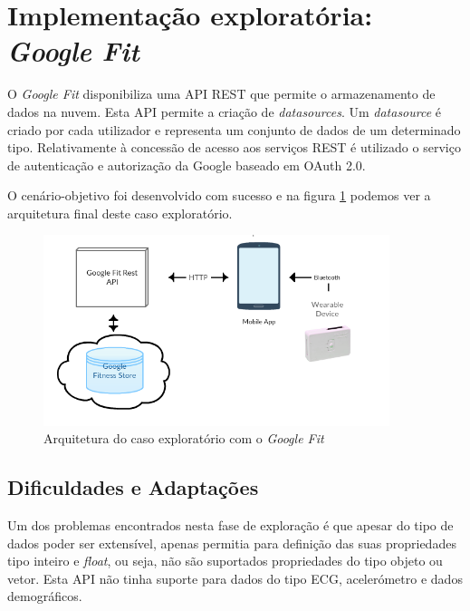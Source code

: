\section{Implementação exploratória: \textit{Google Fit}}

O \textit{Google Fit} disponibiliza uma \gls{API} \gls{REST} que permite o armazenamento de dados na nuvem. Esta \gls{API} permite a criação  de \textit{datasources}. Um \textit{datasource} é criado por cada utilizador e representa  um conjunto de dados de um determinado tipo. Relativamente à concessão de acesso aos serviços \gls{REST} é utilizado o serviço de autenticação e autorização da Google baseado em OAuth 2.0. 
\par
O cenário-objetivo foi desenvolvido com sucesso e na figura \ref{f:exp-googlefit-arch} podemos ver a arquitetura final deste caso exploratório.
\begin{figure}[H]
  \centering
  \includegraphics[width=0.9\textwidth]{imgs/googlefit-arch-exp.png}
  \caption[Arquitetura do caso exploratório com o \textit{Google Fit}]{Arquitetura do caso exploratório com o \textit{Google Fit}}
  
  \label{f:exp-googlefit-arch}
\end{figure}

\subsection{Dificuldades e Adaptações}

Um dos problemas encontrados nesta fase de exploração é que apesar do tipo de dados poder ser extensível, apenas permitia para definição das suas propriedades tipo inteiro e \textit{float}, ou seja, não são suportados propriedades do tipo objeto ou vetor. Esta \gls{API} não tinha suporte para dados do tipo \gls{ECG}, acelerómetro e dados demográficos.

